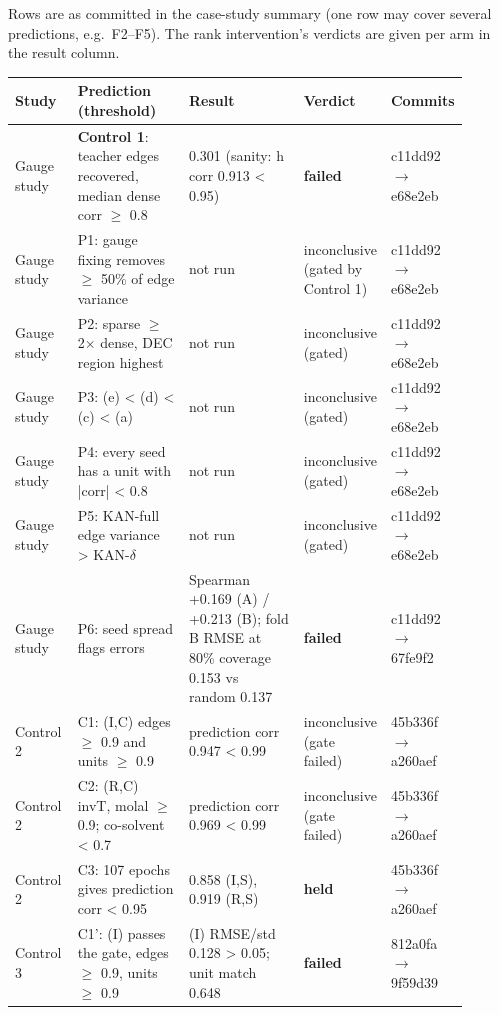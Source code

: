 Rows are as committed in the case-study summary (one row may cover several predictions, e.g.\ F2--F5). The rank intervention's verdicts are given per arm in the result column.

{\footnotesize\setlength{\tabcolsep}{3pt}
\begin{longtable}{R{0.14\linewidth} R{0.26\linewidth} R{0.29\linewidth} R{0.10\linewidth} R{0.11\linewidth}}
\toprule
Study & Prediction (threshold) & Result & Verdict & Commits \\
\midrule
\endhead
Gauge study & \textbf{Control 1}: teacher edges recovered, median dense corr $\geq$ 0.8 & 0.301 (sanity: h corr 0.913 < 0.95) & \textbf{failed} & c11dd92$\to$\allowbreak{}e68e2eb \\
Gauge study & P1: gauge fixing removes $\geq$ 50\% of edge variance & not run & inconclusive (gated by Control 1) & c11dd92$\to$\allowbreak{}e68e2eb \\
Gauge study & P2: sparse $\geq$ 2$\times$ dense, DEC region highest & not run & inconclusive (gated) & c11dd92$\to$\allowbreak{}e68e2eb \\
Gauge study & P3: (e) < (d) < (c) < (a) & not run & inconclusive (gated) & c11dd92$\to$\allowbreak{}e68e2eb \\
Gauge study & P4: every seed has a unit with |corr| < 0.8 & not run & inconclusive (gated) & c11dd92$\to$\allowbreak{}e68e2eb \\
Gauge study & P5: KAN-full edge variance > KAN-$\delta$ & not run & inconclusive (gated) & c11dd92$\to$\allowbreak{}e68e2eb \\
Gauge study & P6: seed spread flags errors & Spearman +0.169 (A) / +0.213 (B); fold B RMSE at 80\% coverage 0.153 vs random 0.137 & \textbf{failed} & c11dd92$\to$\allowbreak{}67fe9f2 \\
Control 2 & C1: (I,C) edges $\geq$ 0.9 and units $\geq$ 0.9 & prediction corr 0.947 < 0.99 & inconclusive (gate failed) & 45b336f$\to$\allowbreak{}a260aef \\
Control 2 & C2: (R,C) invT, molal $\geq$ 0.9; co-solvent < 0.7 & prediction corr 0.969 < 0.99 & inconclusive (gate failed) & 45b336f$\to$\allowbreak{}a260aef \\
Control 2 & C3: 107 epochs gives prediction corr < 0.95 & 0.858 (I,S), 0.919 (R,S) & \textbf{held} & 45b336f$\to$\allowbreak{}a260aef \\
Control 3 & C1': (I) passes the gate, edges $\geq$ 0.9, units $\geq$ 0.9 & (I) RMSE/std 0.128 > 0.05; unit match 0.648 & \textbf{failed} & 812a0fa$\to$\allowbreak{}9f59d39 \\

\end{longtable}}
